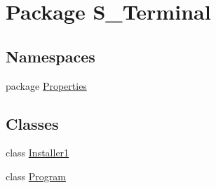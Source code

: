 \hypertarget{namespace_s___terminal}{\section{Package S\+\_\+\+Terminal}
\label{namespace_s___terminal}
}
\subsection*{Namespaces}
\begin{DoxyCompactItemize}
\item 
package \hyperlink{namespace_s___terminal_1_1_properties}{Properties}
\end{DoxyCompactItemize}
\subsection*{Classes}
\begin{DoxyCompactItemize}
\item 
class \hyperlink{class_s___terminal_1_1_installer1}{Installer1}
\item 
class \hyperlink{class_s___terminal_1_1_program}{Program}
\end{DoxyCompactItemize}

